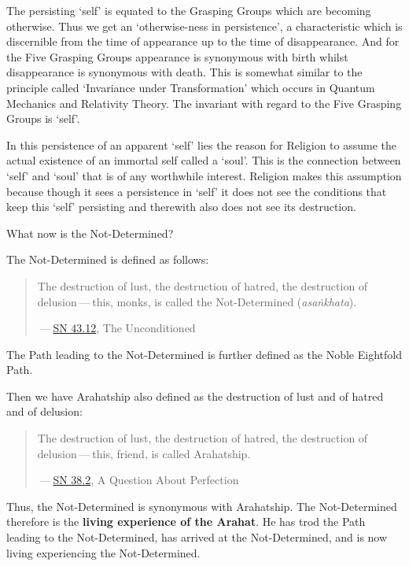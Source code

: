 The persisting `self' is equated to the Grasping Groups which are becoming otherwise. Thus we get an `otherwise-ness in persistence', a characteristic which is discernible from the time of appearance up to the time of disappearance. And for the Five Grasping Groups appearance is synonymous with birth whilst disappearance is synonymous with death. This is somewhat similar to the principle called `Invariance under Transformation' which occurs in Quantum Mechanics and Relativity Theory. The invariant with regard to the Five Grasping Groups is `self'.

In this persistence of an apparent `self' lies the reason for Religion to assume the actual existence of an immortal self called a `soul'. This is the connection between `self' and `soul' that is of any worthwhile interest. Religion makes this assumption because though it sees a persistence in `self' it does not see the conditions that keep this `self' persisting and therewith also does not see its destruction.

What now is the Not-Determined?

The Not-Determined is defined as follows:

\begin{quote}
The destruction of lust, the destruction of hatred, the destruction of delusion --- this, monks, is called the Not-Determined (\emph{asaṅkhata}).

 --- \href{https://suttacentral.net/sn43.12/en/bodhi}{SN 43.12}, The Unconditioned
\end{quote}

The Path leading to the Not-Determined is further defined as the Noble Eightfold Path.

Then we have Arahatship also defined as the destruction of lust and of hatred and of delusion:

\begin{quote}
The destruction of lust, the destruction of hatred, the destruction of delusion --- this, friend, is called Arahatship.

 --- \href{https://suttacentral.net/sn38.2/en/sujato}{SN 38.2}, A Question About Perfection
\end{quote}

\protect\hypertarget{living-experience}{}{}Thus, the Not-Determined is synonymous with Arahatship. The Not-Determined therefore is the \textbf{living experience of the Arahat}. He has trod the Path leading to the Not-Determined, has arrived at the Not-Determined, and is now living experiencing the Not-Determined.

